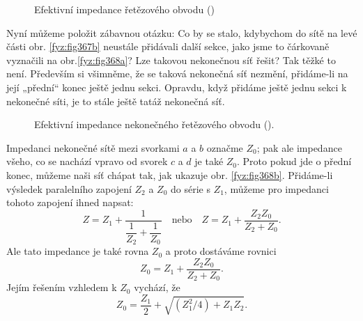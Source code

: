   \begin{figure}[ht!] %
    \centering
       \newline
       \newline
    \caption{Efektivní impedance řetězového obvodu
             (\cite[s.~407]{Feynman02})}
    \label{fyz:fig367}
  \end{figure}
  
  Nyní můžeme položit zábavnou otázku: Co by se stalo, kdybychom do sítě na levé části obr. 
  \ref{fyz:fig367b} neustále přidávali další sekce, jako jsme to čárkovaně vyznačili na 
  obr.\ref{fyz:fig368a}? Lze takovou nekonečnou síť řešit? Tak těžké to není. Především si 
  všimněme, že se taková nekonečná síť nezmění, přidáme-li na její „přední“ konec ještě jednu 
  sekci. Opravdu, když přidáme ještě jednu sekci k nekonečné síti, je to stále ještě tatáž 
  nekonečná síť.
  
  \begin{figure}[ht!] %
    \centering
       \newline
    \caption{Efektivní impedance nekonečného řetězového obvodu
             (\cite[s.~408]{Feynman02}).}
    \label{fyz:fig368}
  \end{figure}

  Impedanci nekonečné sítě mezi svorkami \(a\) a \(b\) označme \(Z_0\); pak ale impedance všeho, co 
  se nachází vpravo od svorek \(c\) a \(d\) je také \(Z_0\). Proto pokud jde o přední konec, můžeme 
  naši síť chápat tak, jak ukazuje obr. \ref{fyz:fig368b}. Přidáme-li výsledek paralelního zapojení 
  \(Z_2\) a \(Z_0\) do série s \(Z_1\), můžeme pro impedanci tohoto zapojení ihned napsat:
  \begin{equation*}
    Z = Z_1 + \dfrac{1}{\dfrac{1}{Z_2}+\dfrac{1}{Z_0}} \quad\text{nebo}\quad
    Z = Z_1 + \dfrac{Z_2Z_0}{Z_2 + Z_0}.
  \end{equation*}
  Ale tato impedance je také rovna \(Z_0\) a proto dostáváme rovnici
  \begin{equation*}
    Z_0 = Z_1 + \dfrac{Z_2Z_0}{Z_2 + Z_0}.
  \end{equation*}
  Jejím řešením vzhledem k \(Z_0\) vychází, že
  \begin{equation}\label{fyz:eq498}
    Z_0 = \dfrac{Z_1}{2} + \sqrt{(Z_1^2/4) + Z_1Z_2}.
  \end{equation}
  
